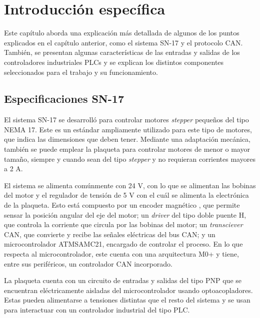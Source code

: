 \chapter{Introducción específica} %

\label{Chapter2}

Este capítulo aborda una explicación más detallada de algunos de los puntos explicados en el capítulo anterior, como el sistema SN-17 y el protocolo CAN. También, se presentan algunas características de las entradas y salidas de los controladores industriales PLCs y se explican los distintos componentes seleccionados para el trabajo y su funcionamiento.

\section{Especificaciones SN-17}

El sistema SN-17 se desarrolló para controlar motores \textit{stepper} pequeños del tipo NEMA 17. Este es un estándar ampliamente utilizado para este tipo de motores, que indica las dimensiones que deben tener. Mediante una adaptación mecánica, también se puede emplear la plaqueta para controlar motores de menor o mayor tamaño, siempre y cuando sean del tipo \textit{stepper} y no requieran corrientes mayores a 2 A.

El sistema se alimenta comúnmente con 24 V, con lo que se alimentan las bobinas del motor y el regulador de tensión de 5 V con el cuál se alimenta la electrónica de la plaqueta. Esto está compuesto por un encoder magnético \citep{web_AS5047D}, que permite sensar la posición angular del eje del motor; un \textit{driver} del tipo doble puente H\citep{web_A4954}, que controla la corriente que circula por las bobinas del motor; un \textit{transciever} CAN\citep{web_transciever_CAN}, que convierte y recibe las señales eléctricas del bus CAN; y un microcontrolador ATMSAMC21\citep{web_ATSAMC21G18A}, encargado de controlar el proceso. En lo que respecta al microcontrolador, este cuenta con una arquitectura M0+ y tiene, entre sus periféricos, un controlador CAN incorporado.

La plaqueta cuenta con un circuito de entradas y salidas del tipo PNP que se encuentran eléctricamente aisladas del microcontrolador usando optoacopladores\citep{web_optoacopladores_LTV}. Estas pueden alimentarse a tensiones distintas que el resto del sistema y se usan para interactuar con un controlador industrial del tipo PLC.

